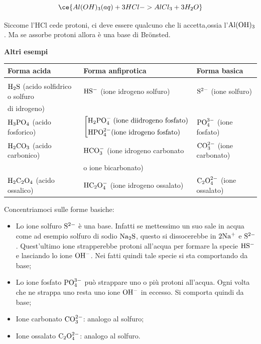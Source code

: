 $$\ce{Al(OH)_3(aq) + 3HCl -> AlCl_3 + 3H_2O}$$

Siccome l'HCl cede protoni, ci deve essere qualcuno che li accetta,ossia l'$\rm Al(OH)_3$. Ma se assorbe protoni allora è una base di Brönsted.

\vspace{0.2cm}\textbf{Altri esempi}

\vspace{-0.3cm}\begin{center}
    \footnotesize\begin{tabular}{|p{5.2cm}p{5.4cm}p{3.8cm}|}
    \hline
    \textbf{Forma acida} & \textbf{Forma anfiprotica} & \textbf{Forma basica}\\
    \hline
    &&\\[-1.2ex]
    $\rm H_2S$ (acido solfidrico o solfuro & $\rm HS^-$ (ione idrogeno solfuro) & $\rm S^{2-}$ (ione solfuro)\\
    di idrogeno)&&\\[0.7ex]
    $\rm H_3PO_4$ (acido fosforico) &  \hspace{-0.2cm}$\left[
\begin{aligned}
    \text{H}_2\text{PO}_4^- \; \text{(ione diidrogeno fosfato)}\\
    \text{HPO}_4^{2-} \text{(ione idrogeno fosfato)} \hspace{0.4cm}
\end{aligned}
\right .$
 & $\rm PO_4^{3-}$ (ione fosfato)\\[3ex]
 $\rm H_2CO_3$ (acido carbonico) & $\rm HCO_3^-$ (ione idrogeno carbonato& $\rm CO_3^{2-}$ (ione carbonato)\\
 & o ione bicarbonato) &\\[0.7ex]
 $\rm H_2C_2O_4$ (acido ossalico) & $\rm HC_2O_4^-$ (ione idrogeno ossalato) & $\rm C_2O_4^{2-}$ (ione ossalato)\\[0.7ex]
 \hline
    \end{tabular}
\end{center}

Concentriamoci sulle forme basiche:

\begin{itemize}
    \item Lo ione solfuro $\rm S^{2-}$ è una base. Infatti se mettessimo un suo sale in acqua come ad esempio solfuro di sodio $\rm Na_2S$, questo si dissocerebbe in $\rm 2Na^+$ e $\rm S^{2-}$. Quest'ultimo ione strapperebbe protoni all'acqua per formare la specie $\rm HS^-$ e lasciando lo ione $\rm OH^-$. Nei fatti quindi tale specie si sta comportando da base;
    \item Lo ione fosfato $\rm PO_4^{3-}$ può strappare uno o più protoni all'acqua. Ogni volta che ne strappa uno resta uno ione $\rm OH^-$ in eccesso. Si comporta quindi da base;
    \item Ione carbonato $\rm CO_3^{2-}$: analogo al solfuro;
    \item Ione ossalato $\rm C_2O_4^{2-}$: analogo al solfuro.
\end{itemize}

